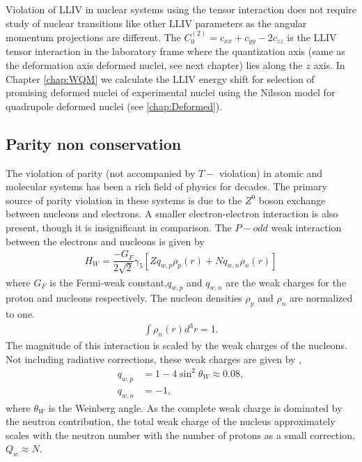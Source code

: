 \documentclass[10pt,a4paper, twoside, openright]{report}
\begin{document}
 \linebreak
Violation of LLIV in nuclear systems using the tensor interaction does not require study of nuclear transitions like other LLIV parameters as the angular momentum projections are different. The $C_0^{(2)} = c_{xx} + c_{yy} - 2c_{zz}$ is the LLIV tensor interaction in the laboratory frame where the quantization axis (same as the deformation axis deformed nuclei, see next chapter) lies along the $z$ axis. In Chapter \ref{chap:WQM} we calculate the LLIV energy shift for selection of promising deformed nuclei of experimental nuclei using the Nilsson model for quadrupole deformed nuclei (see \ref{chap:Deformed}). 
\subsection{Parity non conservation}
The violation of parity (not accompanied by $T-$ violation) in atomic and molecular systems has been a rich field of physics for decades. The primary source of parity violation in these systems is due to the $Z^0$ boson exchange between nucleons and electrons. A smaller electron-electron interaction is also present, though it is insignificant in comparison. The $P-odd$ weak interaction between the electrons and nucleons is given by
\begin{align*}
H_W = \dfrac{-G_F}{2\sqrt{2}} \gamma_5 \left[Zq_{w,p}\rho_{p}\left(r\right) + Nq_{w,n}\rho_{n}\left(r\right)\right]
\end{align*}
where $G_F$ is the Fermi-weak constant,$q_{w,p} $ and $q_{w,n} $ are the weak charges for the proton and nucleons respectively. The nucleon densities $\rho_p$ and $\rho_n$ are normalized to one. 
\begin{align*}
\int \rho_{n}\left(r\right) d^3r = 1.
\end{align*}
The magnitude of this interaction is scaled by the weak charges of the nucleons. Not including radiative corrections, these weak charges are given by \cite{KhriplovichPNC},
\begin{align*}
q_{w,p} &= 1 - 4\sin^2\theta_W \approx 0.08 ,\\
q_{w,n} &= -1,
\end{align*}
where $\theta_W$ is the Weinberg angle. As the complete weak charge is dominated by the neutron contribution, the total weak charge of the nucleus approximately scales with the neutron number with the number of protons as a small correction, $Q_{w} \approx N$.\\
\linebreak
\end{document}
